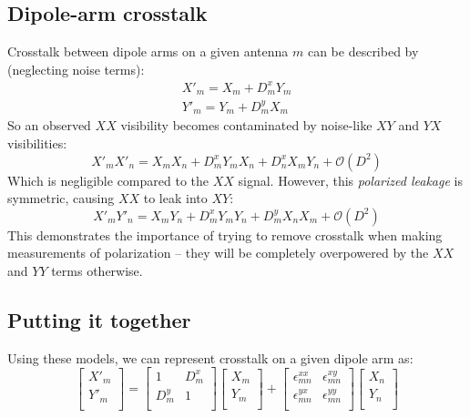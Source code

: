 \documentclass[10pt,a4paper,notitlepage]{article}
\begin{document}
\subsection{Dipole-arm crosstalk}
\label{subsec:theory_dterms}
Crosstalk between dipole arms on a given antenna $m$ can be described by (neglecting noise terms):
\begin{align*}
X'_m = X_m + D^x_mY_m\\
Y'_m = Y_m + D^y_mX_m
\end{align*}
\noindent So an observed $XX$ visibility becomes contaminated by noise-like $XY$ and $YX$ visibilities:
\begin{equation}
X'_mX'_n = X_mX_n + D^x_mY_mX_n + D^x_nX_mY_n  + \mathcal{O}(D^2)
\end{equation}
\noindent Which is negligible compared to the $XX$ signal. However, this \textit{polarized leakage} is symmetric, causing $XX$ to leak into $XY$:
\begin{equation}
X'_mY'_n=X_mY_n + D^x_mY_mY_n + D^y_mX_nX_m + \mathcal{O}(D^2)
\end{equation}
\noindent This demonstrates the importance of trying to remove crosstalk when making measurements of polarization -- they will be completely overpowered by the $XX$ and $YY$ terms otherwise.

\subsection{Putting it together}
\label{subsec:theory_both}
Using these models, we can represent crosstalk on a given dipole arm as:
\begin{equation}
\begin{bmatrix}
X'_m\\
Y'_m\\
\end{bmatrix}
=
\begin{bmatrix}
1 & D^x_m \\
D^y_m & 1 \\
\end{bmatrix}
\begin{bmatrix}
X_m\\
Y_m\\
\end{bmatrix}
+
\begin{bmatrix}
\epsilon^{xx}_{mn} &\epsilon^{xy}_{mn} \\
\epsilon^{yx}_{mn} &\epsilon^{yy}_{mn} \\
\end{bmatrix}
\begin{bmatrix}
X_n\\
Y_n\\
\end{bmatrix}
\end{equation} 
\end{document}
